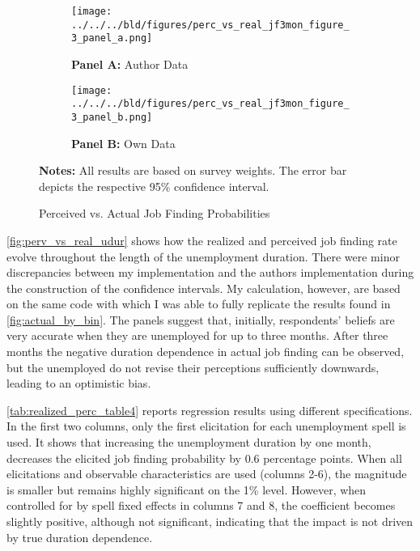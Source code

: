 \documentclass[11pt,a4paper,leqno]{article}
\begin{document}
\begin{figure}[H]
	\begin{subfigure}[b]{0.5\textwidth}
		\centering
		\caption*{\scriptsize{\textbf{Panel A:} Author Data}} \vspace{-.25cm}
		 \texttt{[image: ../../../bld/figures/perc\_vs\_real\_jf3mon\_figure\_3\_panel\_a.png]}
		
	\end{subfigure}
	\begin{subfigure}[b]{0.5\textwidth}
		\centering
		\caption*{\scriptsize{\textbf{Panel B:} Own Data}} \vspace{-.25cm}
		 \texttt{[image: ../../../bld/figures/perc\_vs\_real\_jf3mon\_figure\_3\_panel\_b.png]}
	\end{subfigure}
\begin{minipage}[center]{\textwidth}
	\caption*{ \scriptsize \textbf{Notes:} All results are based on survey weights. The error bar depicts the respective 95\% confidence interval.}
\end{minipage}
  \caption{Perceived vs. Actual Job Finding Probabilities}
\label{fig:perv_vs_real_udur}
\end{figure}

\autoref{fig:perv_vs_real_udur} shows how the realized and perceived job finding rate evolve throughout the length of the unemployment duration. There were minor discrepancies between my implementation and the authors implementation during the construction of the confidence intervals. My calculation, however, are based on the same code with which I was able to fully replicate the results found in \autoref{fig:actual_by_bin}. The panels suggest that, initially, respondents' beliefs are very accurate when they are unemployed for up to three months. After three months the negative duration dependence in actual job finding can be observed, but the unemployed do not revise their perceptions sufficiently downwards, leading to an optimistic bias. 

\autoref{tab:realized_perc_table4} reports regression results using different specifications. In the first two columns, only the first elicitation for each unemployment spell is used. It shows that increasing the unemployment duration by one month, decreases the elicited job finding probability by 0.6 percentage points. 
When all elicitations and observable characteristics are used (columns 2-6), the magnitude is smaller but remains highly significant on the 1\% level. However, when controlled for by spell fixed effects in columns 7 and 8, the coefficient becomes slightly positive, although not significant, indicating that the impact is not driven by true duration dependence.
\end{document}
